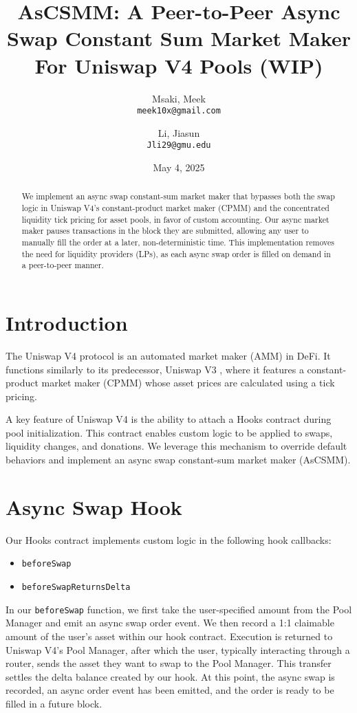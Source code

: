 \documentclass[bibliography=numbered]{article}
\title{AsCSMM: A Peer-to-Peer Async Swap Constant Sum Market Maker For Uniswap V4 Pools (WIP)}
\author{
  Msaki, Meek\\
  \texttt{meek10x@gmail.com}
  \and
  Li, Jiasun\\
  \texttt{Jli29@gmu.edu}
}
\date{May 4, 2025}
\begin{document}
\maketitle

\begin{abstract}
    We implement an async swap constant-sum market maker that bypasses both the swap logic in Uniswap V4’s constant-product market maker (CPMM) and the concentrated liquidity tick pricing for asset pools, in favor of custom accounting. Our async market maker pauses transactions in the block they are submitted, allowing any user to manually fill the order at a later, non-deterministic time. This implementation removes the need for liquidity providers (LPs), as each async swap order is filled on demand in a peer-to-peer manner.
\end{abstract}

\section{Introduction}

The Uniswap V4 \cite{UniswapV4} protocol is an automated market maker (AMM) in DeFi. It functions similarly to its predecessor, Uniswap V3 \cite{UniswapV3}, where it features a constant-product market maker (CPMM) whose asset prices are calculated using a tick pricing.  

A key feature of Uniswap V4 is the ability to attach a Hooks contract during pool initialization. This contract enables custom logic to be applied to swaps, liquidity changes, and donations. We leverage this mechanism to override default behaviors and implement an async swap constant-sum market maker (AsCSMM).

\section{Async Swap Hook}

Our Hooks contract implements custom logic in the following hook callbacks:

\begin{itemize}
\item \texttt{beforeSwap}
\item \texttt{beforeSwapReturnsDelta}
\end{itemize}

In our \texttt{beforeSwap} function, we first take the user-specified amount from the Pool Manager and emit an async swap order event. We then record a 1:1 claimable amount of the user's asset within our hook contract. Execution is returned to Uniswap V4’s Pool Manager, after which the user, typically interacting through a router, sends the asset they want to swap to the Pool Manager. This transfer settles the delta balance created by our hook. At this point, the async swap is recorded, an async order event has been emitted, and the order is ready to be filled in a future block.
\end{document}
